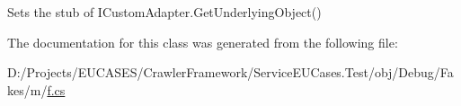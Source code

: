 Sets the stub of I\-Custom\-Adapter.\-Get\-Underlying\-Object()



The documentation for this class was generated from the following file\-:\begin{DoxyCompactItemize}
\item 
D\-:/\-Projects/\-E\-U\-C\-A\-S\-E\-S/\-Crawler\-Framework/\-Service\-E\-U\-Cases.\-Test/obj/\-Debug/\-Fakes/m/\hyperlink{m_2f_8cs}{f.\-cs}\end{DoxyCompactItemize}

